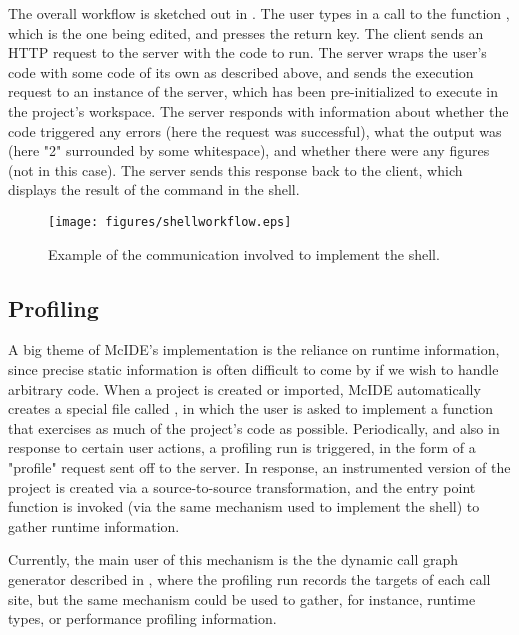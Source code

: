 The overall workflow is sketched out in . The user
types in a call to the function , which is the one being edited, and
presses the return key. The client sends an HTTP request to the server with the
code to run. The server wraps the user's code with some code of its own as
described above, and sends the execution request to an instance of the \matlab
server, which has been pre-initialized to execute in the project's workspace.
The \matlab server responds with information about whether the code triggered
any errors (here the request was successful), what the output was (here "2"
surrounded by some whitespace), and whether there were any figures (not in this
case). The server sends this response back to the client, which displays the
result of the command in the shell.

\begin{figure}
\centering
\texttt{[image: figures/shellworkflow.eps]}
\caption{Example of the communication involved to implement the \matlab shell.}
\label{fig:ShellWorkflow}
\end{figure}

\subsection{Profiling}

A big theme of McIDE's implementation is the reliance on runtime information,
since precise static information is often difficult to come by if we wish to
handle arbitrary \matlab code. When a project is created or imported, McIDE
automatically creates a special file called , in
which the user is asked to implement a function that exercises as much of the
project's code as possible. Periodically, and also in response to certain user
actions, a profiling run is triggered, in the form of a "profile" request sent
off to the server. In response, an instrumented version of the project is
created via a source-to-source transformation, and the entry point function is
invoked (via the same mechanism used to implement the \matlab shell) to gather
runtime information.

Currently, the main user of this mechanism is the the dynamic call graph
generator described in , where the
profiling run records the targets of each call site, but the same mechanism
could be used to gather, for instance, runtime types, or performance profiling
information.
